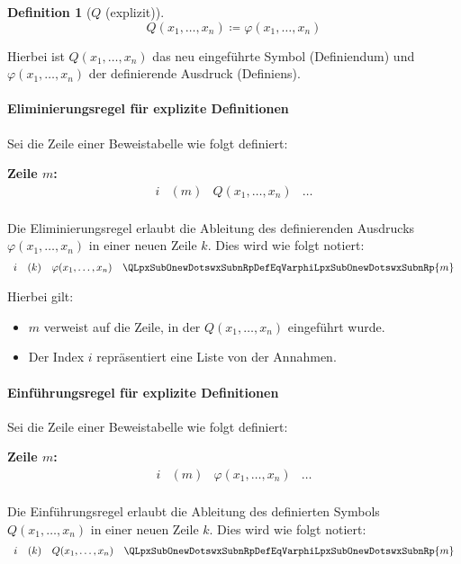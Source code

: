 \documentclass{book}
\theoremstyle{plain}
\theoremstyle{remark}
\theoremstyle{definition}
\newtheorem{definition}{Definition}[section]
\begin{document}
\begin{definition}[\(Q\) (explizit)]
\label{QLpxSubOnewDotswxSubnRpDefEqVarphiLpxSubOnewDotswxSubnRp}
\[
Q(x_1,\dots,x_n) \coloneqq \varphi(x_1,\dots,x_n)
\]    
\end{definition}

Hierbei ist \(Q(x_1,\dots,x_n)\) das neu eingeführte Symbol (Definiendum) und \(\varphi(x_1,\dots,x_n)\) der definierende Ausdruck (Definiens).

\paragraph{Eliminierungsregel für explizite Definitionen}
Sei die Zeile einer Beweistabelle wie folgt definiert:

\textbf{Zeile \(m\):}
\[
\begin{array}{llll}
   i & (m) & Q(x_1,\dots,x_n) & \dots \\
\end{array}
\]

Die Eliminierungsregel erlaubt die Ableitung des definierenden Ausdrucks \(\varphi(x_1,\dots,x_n)\) in einer neuen Zeile \(k\). Dies wird wie folgt notiert:
\[
\begin{array}{llll}
   i& (k) & \varphi(x_1,\dots,x_n) & \QLpxSubOnewDotswxSubnRpDefEqVarphiLpxSubOnewDotswxSubnRp{m} \\
\end{array}
\]

Hierbei gilt:
\begin{itemize}
    \item \(m\) verweist auf die Zeile, in der \(Q(x_1,\dots,x_n)\) eingeführt wurde.
    \item Der Index \(i\) repräsentiert eine Liste von der Annahmen.
\end{itemize}

\paragraph{Einführungsregel für explizite Definitionen}
Sei die Zeile einer Beweistabelle wie folgt definiert:

\textbf{Zeile \(m\):}
\[
\begin{array}{llll}
   i& (m) & \varphi(x_1,\dots,x_n) & \dots \\
\end{array}
\]

Die Einführungsregel erlaubt die Ableitung des definierten Symbols \(Q(x_1,\dots,x_n)\) in einer neuen Zeile \(k\). Dies wird wie folgt notiert:
\[
\begin{array}{llll}
   i& (k) & Q(x_1,\dots,x_n) & \QLpxSubOnewDotswxSubnRpDefEqVarphiLpxSubOnewDotswxSubnRp{m} \\
\end{array}
\]
\end{document}

